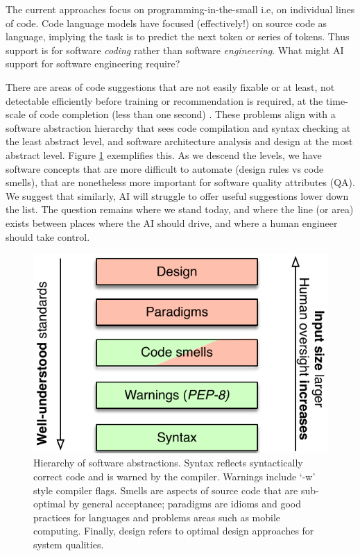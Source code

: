 \label{chapter:Exp}

The current approaches focus on programming-in-the-small i.e, on individual lines of code. 
Code language models have focused (effectively!) on source code as language, implying the task is to predict the next token or series of tokens.
Thus support is for software \textit{coding} rather than software \emph{engineering}. 
What might AI support for software engineering require? 

There are areas of code suggestions that are not easily fixable or at least, not detectable efficiently before training or recommendation is required, at the time-scale of code completion (less than one second) \cite{}.
These problems align with a software abstraction hierarchy that sees code compilation and syntax checking at the least abstract level, and software architecture analysis and design at the most abstract level.
Figure \ref{fig:levels} exemplifies this. 
As we descend the levels, we have software concepts that are more difficult to automate (design rules vs code smells), that are nonetheless more important for software quality attributes (QA). 
We suggest that similarly, AI will struggle to offer useful suggestions lower down the list. 
The question remains where we stand today, and where the line (or area) exists between places where the AI should drive, and where a human engineer should take control.

\begin{figure}
    \includegraphics[width=\linewidth]{Figures/taxonomy-copilot.pdf}
    \caption{Hierarchy of software abstractions. Syntax reflects syntactically correct code and is warned by the compiler. Warnings include `-w' style compiler flags. Smells are aspects of source code that are sub-optimal by general acceptance; paradigms are idioms and good practices for languages and problems areas such as mobile computing. Finally, design refers to optimal design approaches for system qualities.}
    \label{fig:levels}
\end{figure}

